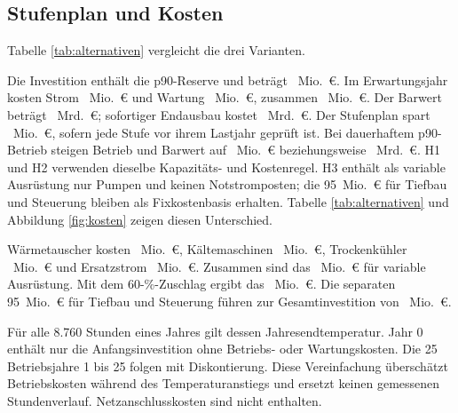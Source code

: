 \subsection{Stufenplan und Kosten}

Tabelle \ref{tab:alternativen} vergleicht die drei Varianten.

\begin{table}[!t]
\centering

\caption{Betrieb bei 2,3~m³/s mit p90-Auslegung, Leistungsangaben in MW, H1 fett. H2 ist günstiger, verändert aber Wasserhaushalt und Hygieneregime. Ihr Zusatzwasser enthält Verdunstung, Abschlämmung und Drift bei drei Konzentrationszyklen, mit Sensitivität bis fünf. H3 verwendet ebenfalls die \mbox{95-Mio.-€-Fixkostenbasis}, aber keinen Notstromposten.}
\label{tab:alternativen}
\end{table}

Die Investition enthält die p90-Reserve und beträgt \CapexFinal~Mio.~€. Im Erwartungsjahr kosten Strom \EnergyCostFinal~Mio.~€ und Wartung \MaintenanceFinal~Mio.~€, zusammen \OpexFinal~Mio.~€. Der Barwert beträgt \NpvHybridFull~Mrd.~€; sofortiger Endausbau kostet \NpvUpfront~Mrd.~€. Der Stufenplan spart \NpvSaving~Mio.~€, sofern jede Stufe vor ihrem Lastjahr geprüft ist. Bei dauerhaftem p90-Betrieb steigen Betrieb und Barwert auf \DesignOpex~Mio.~€ beziehungsweise \DesignNpv~Mrd.~€. H1 und H2 verwenden dieselbe Kapazitäts- und Kostenregel. H3 enthält als variable Ausrüstung nur Pumpen und keinen Notstromposten; die 95~Mio.~€ für Tiefbau und Steuerung bleiben als Fixkostenbasis erhalten. Tabelle \ref{tab:alternativen} und Abbildung \ref{fig:kosten} zeigen diesen Unterschied.

Wärmetauscher kosten \CapexExchanger~Mio.~€, Kältemaschinen \CapexChiller~Mio.~€, Trockenkühler \CapexDryCooler~Mio.~€ und Ersatzstrom \CapexBackup~Mio.~€. Zusammen sind das \CapexVariable~Mio.~€ für variable Ausrüstung. Mit dem 60-\%-Zuschlag ergibt das \CapexEngineered~Mio.~€. Die separaten 95~Mio.~€ für Tiefbau und Steuerung führen zur Gesamtinvestition von \CapexFinal~Mio.~€.

Für alle 8.760 Stunden eines Jahres gilt dessen Jahresendtemperatur. Jahr 0 enthält nur die Anfangsinvestition ohne Betriebs- oder Wartungskosten. Die 25 Betriebsjahre 1 bis 25 folgen mit Diskontierung. Diese Vereinfachung überschätzt Betriebskosten während des Temperaturanstiegs und ersetzt keinen gemessenen Stundenverlauf. Netzanschlusskosten sind nicht enthalten.

